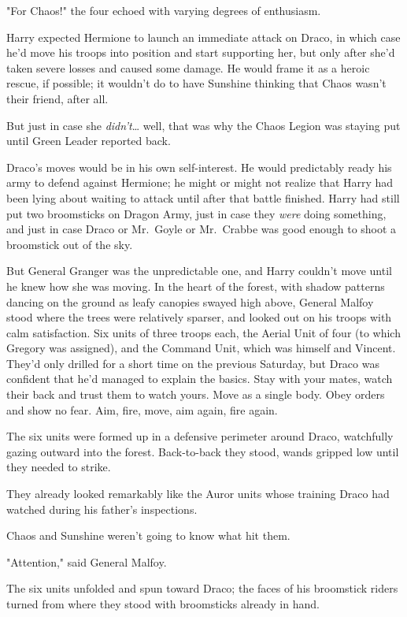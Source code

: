 "For Chaos!" the four echoed with varying degrees of enthusiasm.

Harry expected Hermione to launch an immediate attack on Draco, in which case 
he'd move his troops into position and start supporting her, but only after 
she'd taken severe losses and caused some damage. He would frame it as a heroic 
rescue, if possible; it wouldn't do to have Sunshine thinking that Chaos wasn't 
their friend, after all.

But just in case she \emph{didn't}{\ldots} well, that was why the Chaos Legion 
was staying put until Green Leader reported back.

Draco's moves would be in his own self-interest. He would predictably ready his 
army to defend against Hermione; he might or might not realize that Harry had 
been lying about waiting to attack until after that battle finished. Harry had 
still put two broomsticks on Dragon Army, just in case they \emph{were} doing 
something, and just in case Draco or Mr.~Goyle or Mr.~Crabbe was good enough to 
shoot a broomstick out of the sky.

But General Granger was the unpredictable one, and Harry couldn't move until he 
knew how she was moving.
\sbreak
In the heart of the forest, with shadow patterns dancing on the ground as leafy 
canopies swayed high above, General Malfoy stood where the trees were 
relatively sparser, and looked out on his troops with calm satisfaction. Six 
units of three troops each, the Aerial Unit of four (to which Gregory was 
assigned), and the Command Unit, which was himself and Vincent. They'd only 
drilled for a short time on the previous Saturday, but Draco was confident that 
he'd managed to explain the basics. Stay with your mates, watch their back and 
trust them to watch yours. Move as a single body. Obey orders and show no fear. 
Aim, fire, move, aim again, fire again.

The six units were formed up in a defensive perimeter around Draco, watchfully 
gazing outward into the forest. Back-to-back they stood, wands gripped low 
until they needed to strike.

They already looked remarkably like the Auror units whose training Draco had 
watched during his father's inspections.

Chaos and Sunshine weren't going to know what hit them.

"Attention," said General Malfoy.

The six units unfolded and spun toward Draco; the faces of his broomstick 
riders turned from where they stood with broomsticks already in hand.

